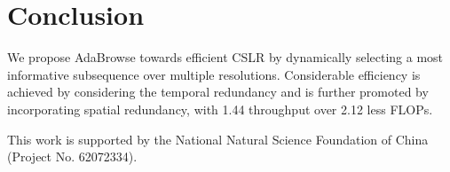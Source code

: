 \documentclass[sigconf]{acmart}
\begin{document}
\section{Conclusion}
We propose AdaBrowse towards efficient CSLR by dynamically selecting a most informative subsequence over multiple resolutions. Considerable efficiency is achieved by considering the temporal redundancy and is further promoted by incorporating spatial redundancy, with 1.44 throughput over 2.12 less FLOPs.\begin{acks}
This work is supported by the National Natural Science Foundation of China (Project No. 62072334).
\end{acks}





\appendix
\end{document}
